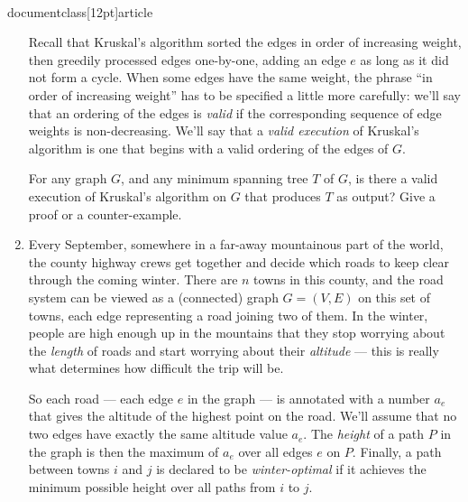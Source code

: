 \\documentclass[12pt]{article}
\begin{document}
\begin{enumerate}
Recall that Kruskal's algorithm sorted the edges in order of
increasing weight, then greedily processed edges one-by-one,
adding an edge $e$ as long as it did not form a cycle.
When some edges have the same weight, the phrase
``in order of increasing weight'' has to be specified
a little more carefully: we'll say that an ordering
of the edges is {\em valid} if the corresponding
sequence of edge weights is non-decreasing.
We'll say that a {\em valid execution} of Kruskal's algorithm
is one that begins with a valid ordering of the edges of $G$.

For any graph $G$, and any minimum spanning tree $T$ of $G$,
is there a valid execution of Kruskal's algorithm
on $G$ that produces $T$ as output?
Give a proof or a counter-example.



\item 

Every September, somewhere in a far-away mountainous part
of the world, the county highway crews get together
and decide which roads to keep clear through the coming winter.
There are $n$ towns in this county, and the road system
can be viewed as a (connected) graph $G = (V,E)$ on this set of towns,
each edge representing a road joining two of them.
In the winter, people are high enough up in the mountains
that they stop worrying about the {\em length} of roads
and start worrying about their {\em altitude} ---
this is really what determines how difficult the trip will be.

So each road --- each edge $e$ in the graph --- is annotated with
a number $a_e$ that gives the altitude of the highest point on the road.
We'll assume that no two edges have exactly the same altitude value $a_e$.
The {\em height} of a path $P$ in the graph is then
the maximum of $a_e$ over all edges $e$ on $P$.
Finally, a path between towns $i$ and $j$ is declared to
be {\em winter-optimal} if it achieves the minimum
possible height over all paths from $i$ to $j$.


\end{enumerate}
\end{document}
